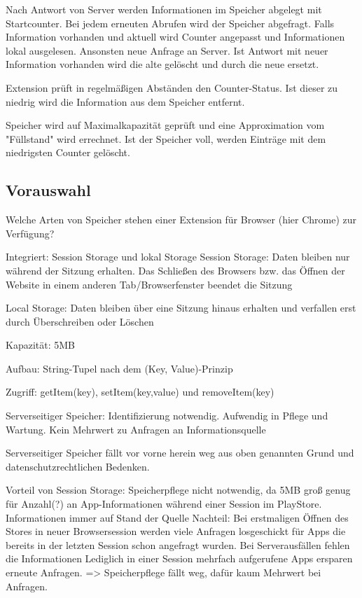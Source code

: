 Nach Antwort von Server werden Informationen im Speicher abgelegt mit Startcounter.
Bei jedem erneuten Abrufen wird der Speicher abgefragt. Falls Information vorhanden und aktuell wird Counter angepasst und Informationen lokal ausgelesen. Ansonsten neue Anfrage an Server. Ist Antwort mit neuer Information vorhanden wird die alte gelöscht und durch die neue ersetzt.

Extension prüft in regelmäßigen Abständen den Counter-Status. Ist dieser zu niedrig wird die Information aus dem Speicher entfernt.

Speicher wird auf Maximalkapazität geprüft und eine Approximation vom "Füllstand" wird errechnet. Ist der Speicher voll, werden Einträge mit dem niedrigsten Counter gelöscht.



\subsection{Vorauswahl}

Welche Arten von Speicher stehen einer Extension für Browser (hier Chrome) zur Verfügung?

Integriert: Session Storage und lokal Storage
Session Storage: Daten bleiben nur während der Sitzung erhalten. Das Schließen des Browsers bzw. das Öffnen der Website in einem anderen Tab/Browserfenster beendet die Sitzung

Local Storage: Daten bleiben über eine Sitzung hinaus erhalten und verfallen erst durch Überschreiben oder Löschen

Kapazität: 5MB

Aufbau: String-Tupel nach dem (Key, Value)-Prinzip

Zugriff: getItem(key), setItem(key,value) und removeItem(key)


Serverseitiger Speicher:
Identifizierung notwendig. Aufwendig in Pflege und Wartung. Kein Mehrwert zu Anfragen an Informationsquelle

Serverseitiger Speicher fällt vor vorne herein weg aus oben genannten Grund und datenschutzrechtlichen Bedenken.

Vorteil von Session Storage: Speicherpflege nicht notwendig, da 5MB groß genug für Anzahl(?) an App-Informationen während einer Session im PlayStore. Informationen immer auf Stand der Quelle
Nachteil: Bei erstmaligen Öffnen des Stores in neuer Browsersession werden viele Anfragen losgeschickt für Apps die bereits in der letzten Session schon angefragt wurden. Bei Serverausfällen fehlen die Informationen
Lediglich in einer Session mehrfach aufgerufene Apps ersparen erneute Anfragen.
=> Speicherpflege fällt weg, dafür kaum Mehrwert bei Anfragen.

